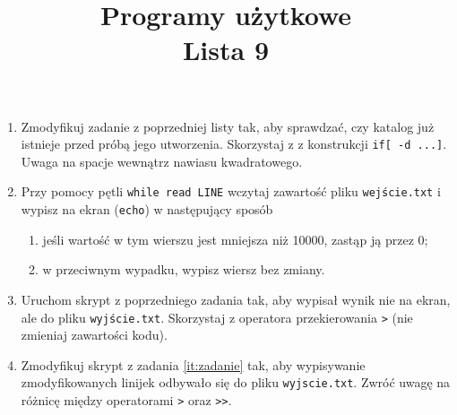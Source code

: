 \documentclass[12pt, letterpaper]{article}
\title{Programy użytkowe \\ Lista 9}
\date{}
\begin{document}
\maketitle
\begin{enumerate}
    \item Zmodyfikuj zadanie z poprzedniej listy tak, aby sprawdzać, czy katalog już istnieje przed próbą jego utworzenia. Skorzystaj z z konstrukcji \verb|if[ -d ...]|. Uwaga na spacje wewnątrz nawiasu kwadratowego.
    \item Przy pomocy pętli \texttt{while read LINE} wczytaj zawartość pliku \texttt{wejście.txt} i wypisz na ekran 
    (\texttt{echo}) w następujący sposób
    \begin{enumerate}
        \item jeśli wartość w tym wierszu jest mniejsza niż 10000, zastąp ją przez 0;
        \item w przeciwnym wypadku, wypisz wiersz bez zmiany.
    \end{enumerate}
    \label{it:zadanie}
    \item Uruchom skrypt z poprzedniego zadania tak, aby wypisał wynik nie na ekran, ale do pliku \texttt{wyjście.txt}. Skorzystaj z operatora przekierowania \verb|>| (nie zmieniaj zawartości kodu).
    \item Zmodyfikuj skrypt z zadania \ref{it:zadanie} tak, aby wypisywanie zmodyfikowanych linijek odbywało się do pliku \texttt{wyjscie.txt}. Zwróć uwagę na różnicę między operatorami \verb|>| oraz \verb|>>|.
    
\end{enumerate}
\end{document}
